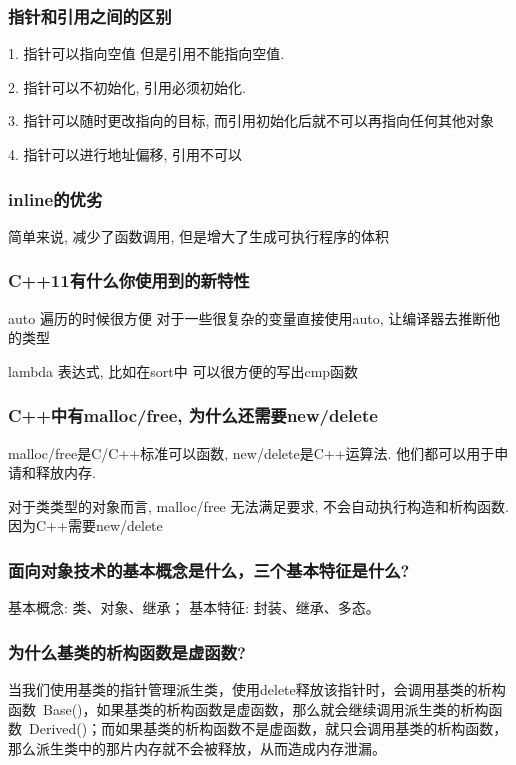 \documentclass[UTF8]{ctexart}
\begin{document}
\subsubsection{指针和引用之间的区别}
1. 指针可以指向空值 但是引用不能指向空值. \par
2. 指针可以不初始化, 引用必须初始化. \par
3. 指针可以随时更改指向的目标, 而引用初始化后就不可以再指向任何其他对象 \par
4. 指针可以进行地址偏移, 引用不可以 \par
\subsubsection{inline的优劣}
简单来说, 减少了函数调用, 但是增大了生成可执行程序的体积 \par
\subsubsection{C++11有什么你使用到的新特性}
auto 遍历的时候很方便 对于一些很复杂的变量直接使用auto, 让编译器去推断他的类型\par
lambda 表达式, 比如在sort中 可以很方便的写出cmp函数 \par
\subsubsection{C++中有malloc/free, 为什么还需要new/delete}
malloc/free是C/C++标准可以函数, new/delete是C++运算法. 他们都可以用于申请和释放内存. \par
对于类类型的对象而言, malloc/free 无法满足要求, 不会自动执行构造和析构函数. 因为C++需要new/delete \par
\subsubsection{面向对象技术的基本概念是什么，三个基本特征是什么?}
基本概念: 类、对象、继承； 基本特征: 封装、继承、多态。\par
\subsubsection{为什么基类的析构函数是虚函数?}
当我们使用基类的指针管理派生类，使用delete释放该指针时，会调用基类的析构函数~Base()，如果基类的析构函数是虚函数，那么就会继续调用派生类的析构函数~Derived()；而如果基类的析构函数不是虚函数，就只会调用基类的析构函数，那么派生类中的那片内存就不会被释放，从而造成内存泄漏。 \par
\end{document}
